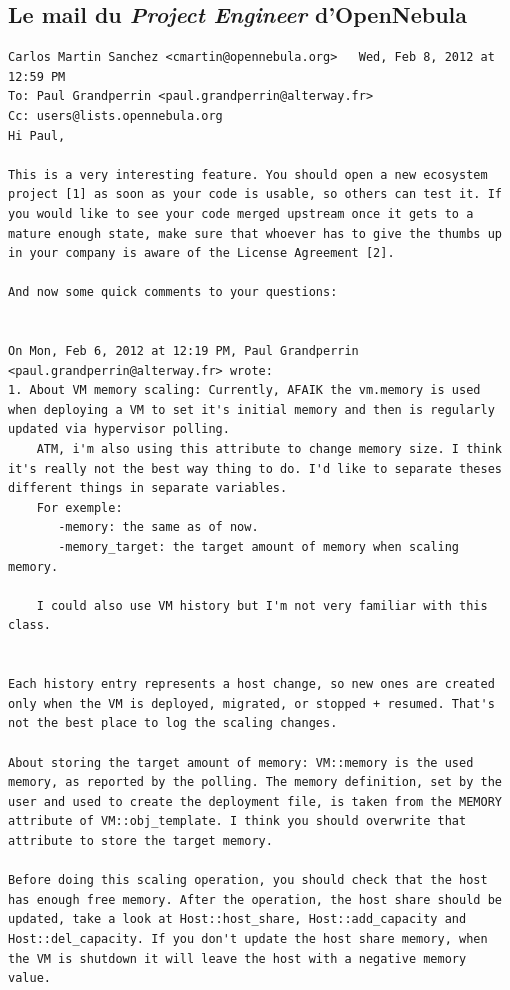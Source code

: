 \subsection{Le mail du \emph{Project Engineer} d'OpenNebula}
\begin{lstlisting}
Carlos Martin Sanchez <cmartin@opennebula.org>	 Wed, Feb 8, 2012 at 12:59 PM
To: Paul Grandperrin <paul.grandperrin@alterway.fr>
Cc: users@lists.opennebula.org
Hi Paul,

This is a very interesting feature. You should open a new ecosystem project [1] as soon as your code is usable, so others can test it. If you would like to see your code merged upstream once it gets to a mature enough state, make sure that whoever has to give the thumbs up in your company is aware of the License Agreement [2].

And now some quick comments to your questions:


On Mon, Feb 6, 2012 at 12:19 PM, Paul Grandperrin <paul.grandperrin@alterway.fr> wrote:
1. About VM memory scaling: Currently, AFAIK the vm.memory is used when deploying a VM to set it's initial memory and then is regularly updated via hypervisor polling.
    ATM, i'm also using this attribute to change memory size. I think it's really not the best way thing to do. I'd like to separate theses different things in separate variables.
    For exemple:
       -memory: the same as of now.
       -memory_target: the target amount of memory when scaling memory.

    I could also use VM history but I'm not very familiar with this class.


Each history entry represents a host change, so new ones are created only when the VM is deployed, migrated, or stopped + resumed. That's not the best place to log the scaling changes.

About storing the target amount of memory: VM::memory is the used memory, as reported by the polling. The memory definition, set by the user and used to create the deployment file, is taken from the MEMORY attribute of VM::obj_template. I think you should overwrite that attribute to store the target memory.

Before doing this scaling operation, you should check that the host has enough free memory. After the operation, the host share should be updated, take a look at Host::host_share, Host::add_capacity and Host::del_capacity. If you don't update the host share memory, when the VM is shutdown it will leave the host with a negative memory value.


\end{lstlisting}

